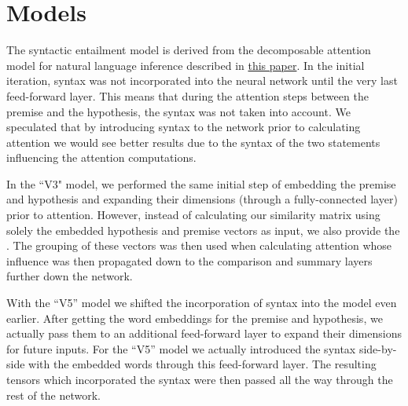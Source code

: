 \documentclass[11pt,a4paper]{article}
\begin{document}
\begin{table}[h]
  \caption{Syntail-v1 and DA model accuracies on the SciTail dataset.}
\label{table:v1-accuracies}
\end{table}

\section{Models}

The syntactic entailment model is derived from the decomposable attention model for natural language inference described in \href{https://arxiv.org/pdf/1606.01933.pdf}{this paper}. In the initial iteration, syntax was not incorporated into the neural network until the very last feed-forward layer. This means that during the attention steps between the premise and the hypothesis, the syntax was not taken into account. We speculated that by introducing syntax to the network prior to calculating attention we would see better results due to the syntax of the two statements influencing the attention computations.

In the ``V3" model, we performed the same initial step of embedding the premise and hypothesis and expanding their dimensions (through a fully-connected layer) prior to attention. However, instead of calculating our similarity matrix using solely the embedded hypothesis and premise vectors as input, we also provide the . The grouping of these vectors was then used when calculating attention whose influence was then propagated down to the comparison and summary layers further down the network. 

With the “V5” model we shifted the incorporation of syntax into the model even earlier. After getting the word embeddings for the premise and hypothesis, we actually pass them to an additional feed-forward layer to expand their dimensions for future inputs. For the “V5” model we actually introduced the syntax side-by-side with the embedded words through this feed-forward layer. The resulting tensors which incorporated the syntax were then passed all the way through the rest of the network. 
\end{document}
